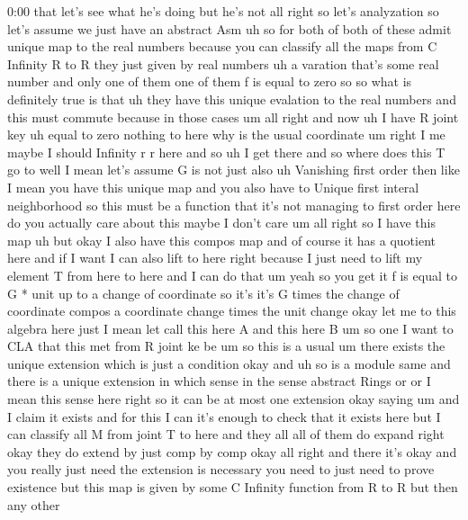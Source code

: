 \begin{unfinished}{0:00}
that  let's  see  what  he's  doing  but  he's
not
all  right  so  let's  analyzation  so  let's
assume  we  just  have  an  abstract
Asm  uh  so  for  both  of  both  of  these
admit  unique  map  to  the  real
numbers  because  you  can  classify  all  the
maps  from  C  Infinity  R  to  R  they  just
given  by  real  numbers  uh  a  varation
that's  some  real  number  and  only  one  of
them  one  of  them  f  is  equal  to  zero  so
so  what  is  definitely  true  is  that  uh
they  have  this  unique  evalation  to  the
real  numbers  and  this  must  commute
because  in  those
cases  um  all  right  and
now  uh  I  have  R  joint  key  uh  equal  to
zero  nothing  to  here  why  is  the  usual
coordinate
um  right  I  me  maybe  I  should  Infinity  r
r
here
and  so  uh  I  get  there  and  so  where  does
this  T  go
to  well  I  mean  let's  assume  G  is  not
just  also  uh  Vanishing  first  order
then  like  I  mean  you  have  this  unique
map  and  you  also  have  to  Unique  first
interal  neighborhood  so  this  must  be  a
function  that  it's  not  managing  to  first
order  here  do  you  actually  care  about
this  maybe  I  don't  care  um
all  right  so  I  have  this  map  uh  but  okay
I  also  have  this  compos
map  and  of  course  it  has  a  quotient
here
and  if  I  want  I  can  also  lift  to  here
right  because  I  just  need  to  lift  my
element  T  from  here  to  here  and  I  can  do
that
um  yeah  so  you  get  it  f  is  equal  to  G  *
unit  up  to  a  change  of
coordinate  so  it's  it's  G  times  the
change  of  coordinate  compos  a  coordinate
change  times  the  unit
change
okay  let  me  to  this  algebra  here  just  I
mean  let  call  this  here  A  and  this  here
B  um  so  one  I  want  to  CLA  that  this  met
from  R  joint
ke
be
um
so  this  is  a  usual  um  there  exists  the
unique  extension  which  is  just  a
condition
okay
and  uh  so  is  a  module  same
and  there  is  a  unique  extension  in  which
sense  in  the  sense  abstract  Rings  or  or
I
mean  this  sense  here  right  so  it  can  be
at  most  one  extension  okay  saying  um  and
I  claim  it  exists  and  for  this  I  can
it's  enough  to  check  that  it  exists  here
but  I  can  classify  all  M  from  joint  T  to
here  and  they  all  all  of  them  do  expand
right  okay  they  do  extend  by  just  comp
by  comp  okay  all
right  and  there  it's  okay  and  you  really
just  need  the  extension  is  necessary  you
need  to  just  need  to  prove  existence  but
this  map  is  given  by  some  C  Infinity
function  from  R  to  R  but  then  any  other

\end{unfinished}
